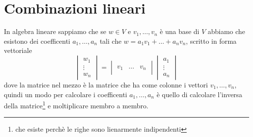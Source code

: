 \documentclass[11pt,a4paper]{article}
\theoremstyle{definition}
\theoremstyle{plain}
\theoremstyle{plain}
\begin{document}
	\section{Combinazioni lineari}
		In algebra lineare sappiamo che se $w\in V$ e ${v_1,\dots,v_n}$ è una base di $V$ abbiamo che esistono dei coefficenti $a_1,\dots,a_n$ tali che $w=a_1 v_1+\dots +a_n v_n$, scritto in forma vettoriale
		\begin{equation}
			\begin{vmatrix}
				w_1\\
				\vdots\\
				w_n
			\end{vmatrix}
			=
			\begin{vmatrix}
				& & \\
				v_1 & \dots & v_n\\
				& & 
			\end{vmatrix}
			\begin{vmatrix}
				a_1\\
				\vdots\\
				a_n
			\end{vmatrix}
		\end{equation}
		dove la matrice nel mezzo è la matrice che ha come colonne i vettori $v_1,\dots,v_n$, quindi un modo per calcolare i coefficenti $a_1,\dots,a_n$ è quello di calcolare l'inversa della matrice\footnote{che esiste perchè le righe sono lienarmente indipendenti} e moltiplicare membro a membro.\newline
\end{document}
